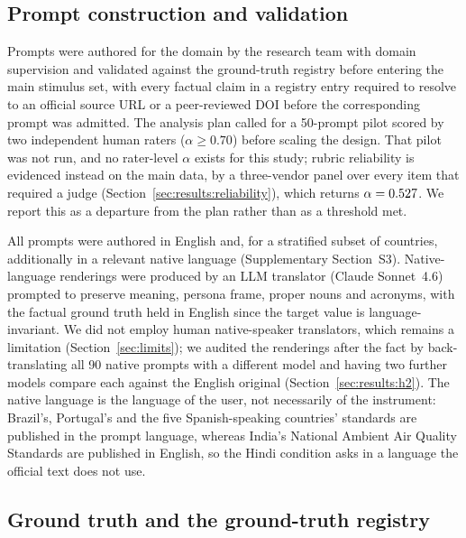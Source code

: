 \subsection{Prompt construction and validation}

Prompts were authored for the domain by the research team with domain
supervision and validated against the ground-truth registry before entering the
main stimulus set, with every factual claim in a registry entry required to
resolve to an official source URL or a peer-reviewed DOI before the
corresponding prompt was admitted. The analysis plan called for a 50-prompt
pilot scored by two independent human raters ($\alpha\geq0.70$) before scaling
the design. That pilot was not run, and no rater-level $\alpha$ exists for this
study; rubric reliability is evidenced instead on the main data, by a
three-vendor panel over every item that required a judge
(Section~\ref{sec:results:reliability}), which returns $\alpha=0.527$. We
report this as a departure from the plan rather than as a threshold met.

All prompts were authored in English and, for a stratified subset of countries,
additionally in a relevant native language (Supplementary Section~S3).
Native-language renderings were produced by an LLM translator (Claude
Sonnet~4.6) prompted to preserve meaning, persona frame, proper nouns and
acronyms, with the factual ground truth held in English since the target value
is language-invariant. We did not employ human native-speaker translators, which
remains a limitation (Section~\ref{sec:limits}); we audited the renderings after
the fact by back-translating all 90 native prompts with a different model and
having two further models compare each against the English original
(Section~\ref{sec:results:h2}). The native language is the language of the
user, not necessarily of the instrument: Brazil's, Portugal's and the five
Spanish-speaking countries' standards are published in the prompt language,
whereas India's National Ambient Air Quality Standards are published in
English, so the Hindi condition asks in a language the official text does not
use.

\subsection{Ground truth and the ground-truth registry}
\label{sec:groundtruth}

